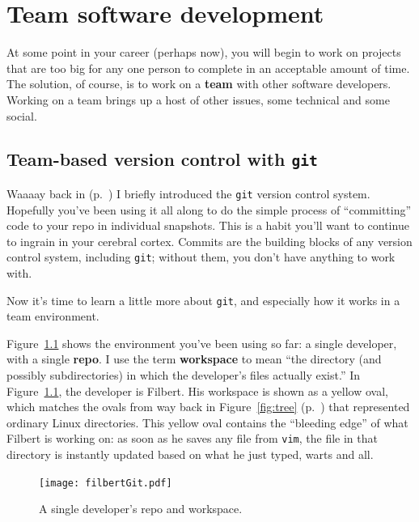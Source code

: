 
\chapter{Team software development}

At some point in your career (perhaps now), you will begin to work on projects
that are too big for any one person to complete in an acceptable amount of
time. The solution, of course, is to work on a \textbf{team} with other
software developers. Working on a team brings up a host of other issues, some
technical and some social.

\section{Team-based version control with \texttt{git}}

Waaaay back in  (p.~\pageref{introduceGit}) I briefly
introduced the \texttt{git} version control system. Hopefully you've been
using it all along to do the simple process of ``committing'' code to your
repo in individual snapshots. This is a habit you'll want to continue to
ingrain in your cerebral cortex. Commits are the building blocks of any
version control system, including \texttt{git}; without them, you don't have
anything to work with.

Now it's time to learn a little more about \texttt{git}, and especially how it
works in a team environment.

Figure~\ref{fig:filbertGit} shows the environment you've been using so far: a
single developer, with a single \textbf{repo}. I use the term
\textbf{workspace} to mean ``the directory (and possibly subdirectories) in
which the developer's files actually exist.'' In Figure~\ref{fig:filbertGit},
the developer is Filbert. His workspace is shown as a yellow oval, which
matches the ovals from way back in Figure~\ref{fig:tree}
(p.~\pageref{fig:tree}) that represented ordinary Linux directories. This
yellow oval contains the ``bleeding edge'' of what Filbert is working on: as
soon as he saves any file from \texttt{vim}, the file in that directory is
instantly updated based on what he just typed, warts and all.

\begin{figure}[ht]
\centering
\texttt{[image: filbertGit.pdf]}
\caption{A single developer's repo and workspace.}
\label{fig:filbertGit}
\end{figure}

